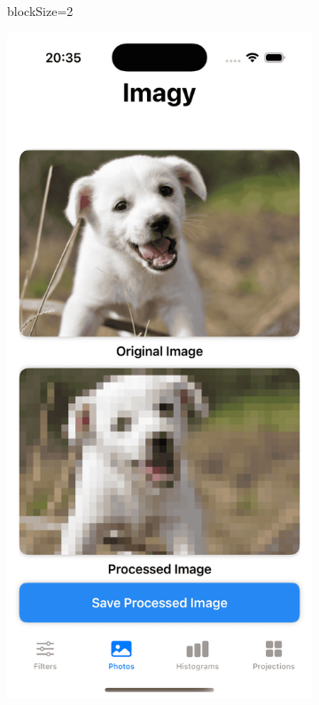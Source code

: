 \documentclass[a4paper]{article}
\begin{document}
\begin{figure}[H]
\begin{subfigure}{0.2\textwidth}
        \caption{blockSize=2}
        \label{fig:dog_mosaic_2}
    \end{subfigure}
    \hfill
    \begin{subfigure}{0.2\textwidth}
        \centering
        \includegraphics[width=\linewidth]{images/dog_mosaic_10.png}

\end{subfigure}
\end{figure}
\end{document}
